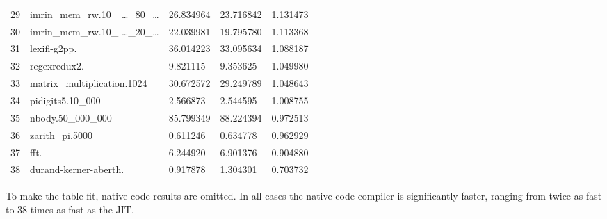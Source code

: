 \documentclass[12pt,a4paper, headings=standardclasses, parskip=on]{scrartcl}
\begin{document}
\begin{longtable}{@{}lllllll@{}}
29 & imrin\_mem\_rw.10\_ \dots\_80\_\dots               & 26.834964            & 23.716842    & 1.131473                      \\
30 & imrin\_mem\_rw.10\_ \dots\_20\_\dots               & 22.039981            & 19.795780    & 1.113368                      \\
31 & lexifi-g2pp.                                       & 36.014223            & 33.095634    & 1.088187                      \\
32 & regexredux2.                                       & 9.821115             & 9.353625     & 1.049980                      \\
33 & matrix\_multiplication.1024                        & 30.672572            & 29.249789    & 1.048643                      \\
34 & pidigits5.10\_000                                  & 2.566873             & 2.544595     & 1.008755                      \\
35 & nbody.50\_000\_000                                 & 85.799349            & 88.224394    & 0.972513                      \\
36 & zarith\_pi.5000                                    & 0.611246             & 0.634778     & 0.962929                      \\
37 & fft.                                               & 6.244920             & 6.901376     & 0.904880                      \\
38 & durand-kerner-aberth.                              & 0.917878             & 1.304301     & 0.703732                      \\ \bottomrule
\end{longtable}

To make the table fit, native-code results are omitted. In all cases the
native-code compiler is significantly faster, ranging from twice as fast to 38
times as fast as the JIT.
\end{document}
